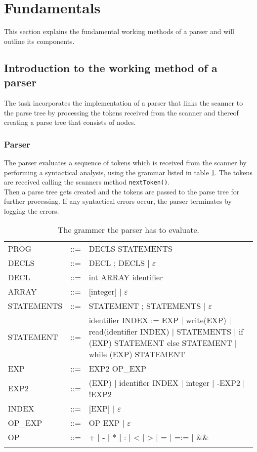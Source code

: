 \section{Fundamentals}
This section explains the fundamental working methods of a parser and will outline its components.

\subsection{Introduction to the working method of a parser}
The task incorporates the implementation of a parser that links the scanner to the parse tree by processing the tokens received from the scanner and thereof creating a parse tree that consists of nodes.

\subsubsection{Parser}
The parser evaluates a sequence of tokens which is received from the scanner by performing a syntactical analysis, using the grammar listed in table \ref{table:grammar}. The tokens are received calling the scanners method \texttt{nextToken()}.\\
Then a parse tree gets created and the tokens are passed to the parse tree for further processing.
If any syntactical errors occur, the parser terminates by logging the errors. 
\begin{longtable}[h!]{llp{10cm}}
	PROG&::=&DECLS STATEMENTS\\
	DECLS&::=&DECL ; DECLS | $ \varepsilon $\\
	DECL&::=&int ARRAY identifier\\
	ARRAY&::=&[integer] | $ \varepsilon $\\
	STATEMENTS&::=&STATEMENT ; STATEMENTS | $ \varepsilon $\\
	STATEMENT&::=&identifier INDEX := EXP | write(EXP) | read(identifier INDEX) | {STATEMENTS} | if (EXP) STATEMENT else STATEMENT | while (EXP) STATEMENT\\
	EXP&::=&EXP2 OP\_EXP\\
	EXP2&::=&(EXP) | identifier INDEX | integer | -EXP2 | !EXP2\\
	INDEX&::=&[EXP] | $ \varepsilon $\\
	OP\_EXP&::=&OP EXP | $ \varepsilon $\\
	OP&::=&+ | - | * | : | < | > | = | =:= | \&\&\\
	
	\caption{The grammer the parser has to evaluate.}
	\label{table:grammar}
\end{longtable}

